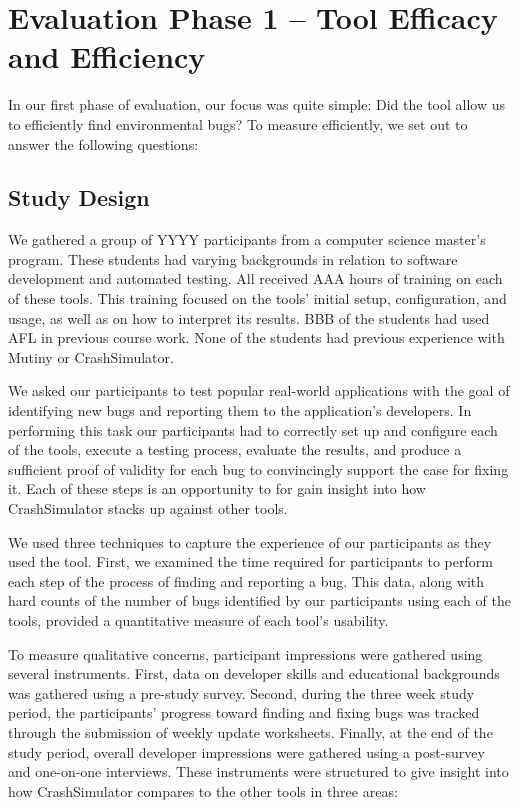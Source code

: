 \section{Evaluation Phase 1 -- Tool Efficacy and Efficiency}
\label{SEC:evaluation}


In our first phase of evaluation, our focus was quite simple: Did the tool
allow us to efficiently find environmental bugs? To measure efficiently, we
set out to answer the following questions:

\subsection{Study Design}

We gathered a group of YYYY participants from a computer science master's
program.  These students had varying backgrounds in relation to software
development and automated testing.  All received AAA hours
of training on each of these tools.  This training focused on the tools'
initial setup, configuration, and usage,
as well as on how to interpret its
results.  BBB of the students had used AFL in previous course work.  None
of the students had previous experience with Mutiny or CrashSimulator.

We asked our participants to test popular real-world applications with the
goal of identifying new bugs and reporting them to the application's
developers.  In performing this task our participants had to correctly set
up and configure each of the tools, execute a testing process, evaluate the
results, and produce a sufficient proof of validity for each bug to
convincingly support the case for fixing it.  Each of these steps is an
opportunity to for gain insight into how CrashSimulator stacks up against
other tools.

We used three techniques to capture the experience of our participants as
they used the tool.  First, we examined the time required for participants
to perform each step of the process of finding and reporting a bug.
This data, along with hard counts of the number of bugs identified by our
participants using each of the tools, provided a quantitative measure of
each tool's usability.

To measure qualitative concerns,
participant impressions were gathered using
several instruments.  First, data on developer skills and educational
backgrounds was gathered using a pre-study survey.
Second, during the three week
study period, the participants' progress toward finding and fixing bugs was
tracked through the submission of weekly update worksheets.  Finally, at
the end of the study period, overall developer impressions were gathered
using a post-survey and one-on-one interviews.  These instruments were
structured to give insight into how CrashSimulator compares to the other
tools in three areas:


